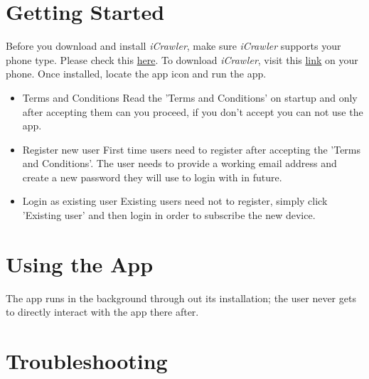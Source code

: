 \documentclass[hidelinks, 12pt, oneside]{article}
\begin{document}
	\section{Getting Started}
	Before you download and install \emph{iCrawler}, make sure \emph{iCrawler} supports
	 your phone type. Please check this \href{https://}{\color{blue}here}.\newline\newline
	 To download \emph{iCrawler}, visit this \href{https://}{\color{blue}link} on your phone. Once
	 installed, locate the app icon and run the app.\
	 \begin{itemize}
	 	\item Terms and Conditions\newline
	 	Read the 'Terms and Conditions' on startup and only after accepting them can you proceed, if you
	 	 don't accept you can not use the app.
	 	\item Register new user\newline
	 	First time users need to register after accepting the 'Terms and Conditions'. The user needs to provide
	 	 a working email address and create a new password they will use to login with in future.
	 	\item Login as existing user\newline
	 	Existing users need not to register, simply click 'Existing user' and then login in order to subscribe the 
	 	new device.
	 \end{itemize}
	 \newpage
	 
	 
	\section{Using the App}
	The app runs in the background through out its installation; the user never 
	gets to directly interact with the app there after.
	\newline\newline
	
	\section{Troubleshooting}\newpage
			
\end{document}
